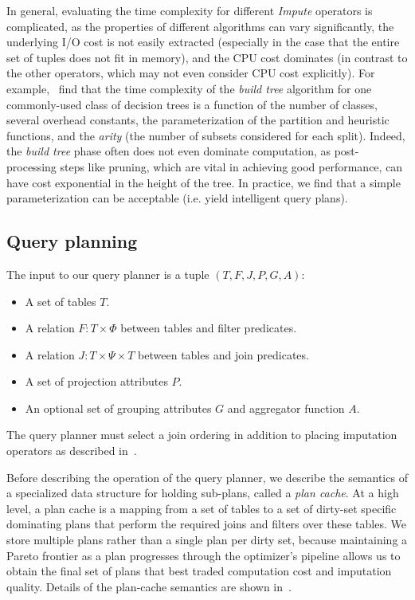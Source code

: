 In general, evaluating the time complexity for different \textit{Impute} operators is
complicated, as the properties of
different algorithms can vary significantly, the underlying I/O cost
is not easily extracted (especially in the case that the entire set of tuples does not
fit in memory), and the CPU cost dominates (in contrast to the other operators, which may
not even consider CPU cost explicitly). For example,~\cite{martin1995time} find that the
time complexity of the \textit{build tree} algorithm for one commonly-used class of
decision trees is a function of the number of classes, several overhead constants, the
parameterization of the partition and heuristic functions, and the \textit{arity} (the
number of subsets considered for each split). Indeed, the \textit{build tree} phase often
does not even dominate computation, as post-processing steps like pruning, which are vital
in achieving good performance, can have cost exponential in the height of the tree. In
practice, we find that a simple parameterization can be acceptable (i.e. yield intelligent query
plans).

\subsection{Query planning}
\label{sec:planning}
The input to our query planner is a tuple $(T, F, J, P, G, A)$:
\begin{itemize}
\item A set of tables $T$.
\item A relation $F: T \times \Phi$ between tables and filter predicates.
\item A relation $J : T \times \Psi \times T$ between tables and join predicates.
\item A set of projection attributes $P$.
\item An optional set of grouping attributes $G$ and aggregator function $A$.
\end{itemize}

The query planner must select a join ordering in addition to placing imputation operators as described in~.

Before describing the operation of the query planner, we describe the semantics of a specialized data structure for holding sub-plans, called a \emph{plan cache}.
At a high level, a plan cache is a mapping from a set of tables to a set of dirty-set specific dominating plans that perform the required joins and filters over these tables.
We store multiple plans rather than a single plan per dirty set, because maintaining a Pareto frontier as a plan progresses through the optimizer's pipeline
allows us to obtain the final set of plans that best traded computation
cost and imputation quality. Details of the plan-cache semantics are shown in~.


